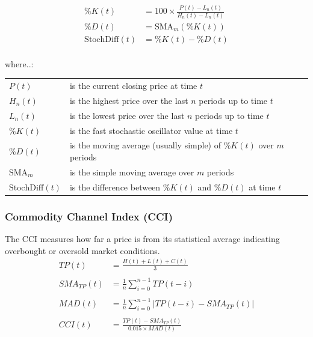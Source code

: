 \documentclass[a4paper,12pt]{report}
\begin{document}
\begin{equation}
\begin{aligned}
  \%K(t) &= 100 \times \frac{P(t) - L_n(t)}{H_n(t) - L_n(t)}  \\
  \%D(t) &= \text{SMA}_m(\%K(t))\\
  \text{StochDiff}(t) &= \%K(t) - \%D(t)\\
\end{aligned}
\end{equation}

\begin{minipage}{\textwidth}

where..:\\

\begin{tabularx}{\textwidth}{@{}l@{\hspace{2em}--\hspace{2em}}X@{}}
  $P(t)$         & is the current closing price at time $t$ \\
  $H_n(t)$       & is the highest price over the last $n$ periods up to time $t$ \\
  $L_n(t)$       & is the lowest price over the last $n$ periods up to time $t$ \\
  $\%K(t)$       & is the fast stochastic oscillator value at time $t$ \\
  $\%D(t)$       & is the moving average (usually simple) of $\%K(t)$ over $m$ periods \\
  $\text{SMA}_m$ & is the simple moving average over $m$ periods \\
  $\text{StochDiff}(t)$ & is the difference between $\%K(t)$ and $\%D(t)$ at time $t$ \\
\end{tabularx}

\end{minipage}

			\subsubsection{Commodity Channel Index (CCI)}

The CCI measures how far a price is from its statistical average indicating overbought or oversold market conditions. \cite{26}\\

\begin{equation}
\begin{aligned}
  TP(t) &= \frac{H(t) + L(t) + C(t)}{3} \\\\
  SMA_{TP}(t) &= \frac{1}{n} \sum_{i=0}^{n-1} TP(t-i) \\\\
  MAD(t) &= \frac{1}{n} \sum_{i=0}^{n-1} |TP(t-i) - SMA_{TP}(t)| \\\\
  CCI(t) &= \frac{TP(t) - SMA_{TP}(t)}{0.015 \times MAD(t)} \\\\
\end{aligned}
\end{equation}
\end{document}
